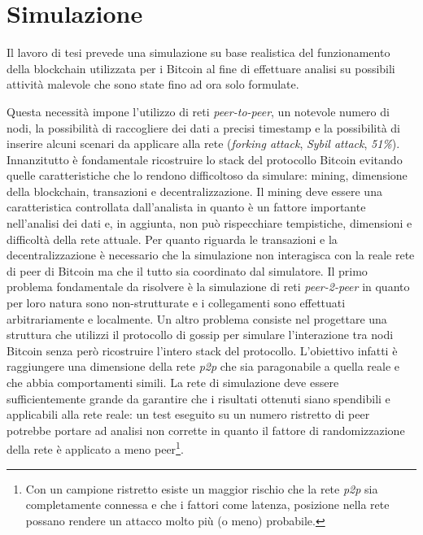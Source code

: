 \chapter{Simulazione}
Il lavoro di tesi prevede una simulazione su base realistica del funzionamento della blockchain utilizzata per i Bitcoin al fine di effettuare analisi su possibili attività malevole che sono state fino ad ora solo formulate.

Questa necessità impone l'utilizzo di reti \textit{peer-to-peer}, un notevole numero di nodi, la possibilità di raccogliere dei dati a precisi timestamp e la possibilità di inserire alcuni scenari da applicare alla rete (\textit{forking attack}, \textit{Sybil attack}, \textit{51\%}).\newline
Innanzitutto è fondamentale ricostruire lo stack del protocollo Bitcoin evitando quelle caratteristiche che lo rendono difficoltoso da simulare: mining, dimensione della blockchain, transazioni e decentralizzazione.\newline
Il mining deve essere una caratteristica controllata dall'analista in quanto è un fattore importante nell'analisi dei dati e, in aggiunta, non può rispecchiare tempistiche, dimensioni e difficoltà della rete attuale.\newline
Per quanto riguarda le transazioni e la decentralizzazione è necessario che la simulazione non interagisca con la reale rete di peer di Bitcoin ma che il tutto sia coordinato dal simulatore.\newline
Il primo problema fondamentale da risolvere è la simulazione di reti \textit{peer-2-peer} in quanto per loro natura sono non-strutturate e i collegamenti sono effettuati arbitrariamente e localmente. Un altro problema consiste nel progettare una struttura che utilizzi il protocollo di gossip per simulare l'interazione tra nodi Bitcoin senza però ricostruire l'intero stack del protocollo. L'obiettivo infatti è raggiungere una dimensione della rete \textit{p2p} che sia paragonabile a quella reale e che abbia comportamenti simili. La rete di simulazione deve essere sufficientemente grande da garantire che i risultati ottenuti siano spendibili e applicabili alla rete reale: un test eseguito su un numero ristretto di peer potrebbe portare ad analisi non corrette in quanto il fattore di randomizzazione della rete è applicato a meno peer\footnote{Con un campione ristretto esiste un maggior rischio che la rete \textit{p2p} sia completamente connessa e che i fattori come latenza, posizione nella rete possano rendere un attacco molto più (o meno) probabile.}.\newline
